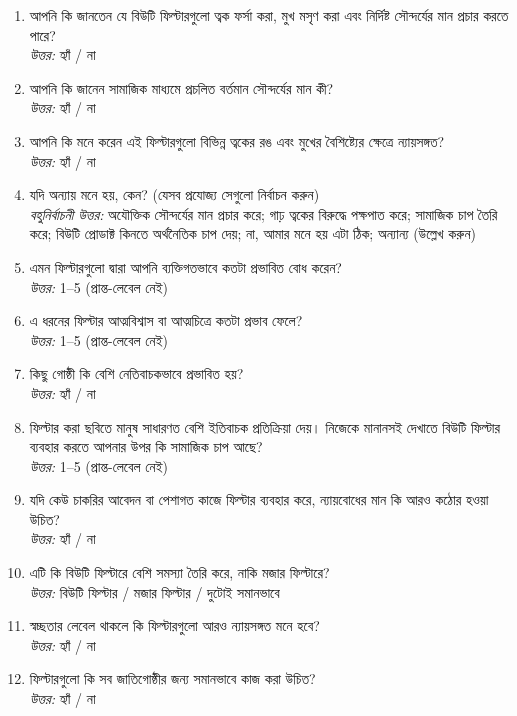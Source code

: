 \documentclass[11pt]{article}
\newcommand{\bn}[1]{{\bengalifont\upshape #1}}
\begin{document}
\begin{enumerate}
\item \bn{আপনি কি জানতেন যে বিউটি ফিল্টারগুলো ত্বক ফর্সা করা, মুখ মসৃণ করা এবং নির্দিষ্ট সৌন্দর্যের মান প্রচার করতে পারে?}\\
\emph{\bn{উত্তর:}} \bn{হ্যাঁ / না}
\item \bn{আপনি কি জানেন সামাজিক মাধ্যমে প্রচলিত বর্তমান সৌন্দর্যের মান কী?}\\
\emph{\bn{উত্তর:}} \bn{হ্যাঁ / না}
\item \bn{আপনি কি মনে করেন এই ফিল্টারগুলো বিভিন্ন ত্বকের রঙ এবং মুখের বৈশিষ্ট্যের ক্ষেত্রে ন্যায়সঙ্গত?}\\
\emph{\bn{উত্তর:}} \bn{হ্যাঁ / না}
\item \bn{যদি অন্যায় মনে হয়, কেন? (যেসব প্রযোজ্য সেগুলো নির্বাচন করুন)}\\
\emph{\bn{বহুনির্বাচনী উত্তর:}} \bn{অযৌক্তিক সৌন্দর্যের মান প্রচার করে; গাঢ় ত্বকের বিরুদ্ধে পক্ষপাত করে; সামাজিক চাপ তৈরি করে; বিউটি প্রোডাক্ট কিনতে অর্থনৈতিক চাপ দেয়; না, আমার মনে হয় এটা ঠিক; অন্যান্য (উল্লেখ করুন)}
\item \bn{এমন ফিল্টারগুলো দ্বারা আপনি ব্যক্তিগতভাবে কতটা প্রভাবিত বোধ করেন?}\\
\emph{\bn{উত্তর:}} 1--5 (\bn{প্রান্ত-লেবেল নেই})
\item \bn{এ ধরনের ফিল্টার আত্মবিশ্বাস বা আত্মচিত্রে কতটা প্রভাব ফেলে?}\\
\emph{\bn{উত্তর:}} 1--5 (\bn{প্রান্ত-লেবেল নেই})
\item \bn{কিছু গোষ্ঠী কি বেশি নেতিবাচকভাবে প্রভাবিত হয়?}\\
\emph{\bn{উত্তর:}} \bn{হ্যাঁ / না}
\item \bn{ফিল্টার করা ছবিতে মানুষ সাধারণত বেশি ইতিবাচক প্রতিক্রিয়া দেয়। নিজেকে মানানসই দেখাতে বিউটি ফিল্টার ব্যবহার করতে আপনার উপর কি সামাজিক চাপ আছে?}\\
\emph{\bn{উত্তর:}} 1--5 (\bn{প্রান্ত-লেবেল নেই})
\item \bn{যদি কেউ চাকরির আবেদন বা পেশাগত কাজে ফিল্টার ব্যবহার করে, ন্যায়বোধের মান কি আরও কঠোর হওয়া উচিত?}\\
\emph{\bn{উত্তর:}} \bn{হ্যাঁ / না}
\item \bn{এটি কি বিউটি ফিল্টারে বেশি সমস্যা তৈরি করে, নাকি মজার ফিল্টারে?}\\
\emph{\bn{উত্তর:}} \bn{বিউটি ফিল্টার / মজার ফিল্টার / দুটোই সমানভাবে}
\item \bn{স্বচ্ছতার লেবেল থাকলে কি ফিল্টারগুলো আরও ন্যায়সঙ্গত মনে হবে?}\\
\emph{\bn{উত্তর:}} \bn{হ্যাঁ / না}
\item \bn{ফিল্টারগুলো কি সব জাতিগোষ্ঠীর জন্য সমানভাবে কাজ করা উচিত?}\\
\emph{\bn{উত্তর:}} \bn{হ্যাঁ / না}
\end{enumerate}
\end{document}
